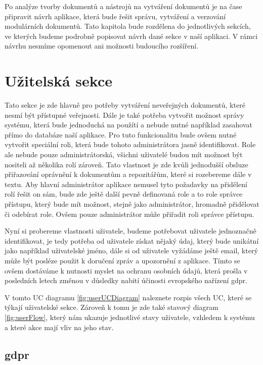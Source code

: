 Po analýze tvorby dokumentů a nástrojů na vytváření dokumentů je na čase připravit návrh aplikace, která bude řešit správu, vytváření a verzování
modulárních dokumentů. Tato kapitola bude rozdělena do jednotlivých sekcích, ve kterých budeme podrobně popisovat návrh dané sekce v naší aplikaci.
V rámci návrhu nesmíme opomenout ani možnosti budoucího rozšíření.

\section{Užitelská sekce}

Tato sekce je zde hlavně pro potřeby vytváření neveřejných dokumentů, které nesmí být přístupné veřejnosti. Dále je také potřeba vytvořit možnost
správy systému, která bude jednoduchá na použítí a nebude nutné například zasahovat přímo do databáze naší aplikace. Pro tuto funkcionalitu bude ovšem
nutné vytvořit speciální roli, která bude tohoto administrátora jasně identifikovat. Role ale nebude pouze administrátorská, všichni uživatelé budou mít
možnost být nositeli až několika rolí zároveň. Tato vlastnost je zde kvůli jednodušší obsluze přiřazování oprávnění k dokumentům a repozitářům, které si rozebereme
dále v textu. Aby hlavní administrátor aplikace nemusel tyto požadavky na přidělení rolí řešit on sám, bude zde ještě další pevně definovaná role a to role
správce přístupu, který bude mít možnost, stejně jako administrátor, hromadně přidělovat či odebírat role. Ovšem pouze administrátor může přiřadit roli správce přístupu.

Nyní si probereme vlastnosti uživatele, budeme potřebovat uživatele jednoznačně identifikovat, je tedy potřeba od uživatele získat nějaký údaj, který bude unikátní
jako například uživatelské jméno, dále si od uživatele vyžádáme ještě email, který může být posléze použit k doručení zpráv a upozornění z aplikace. Tímto se ovšem
dostáváme k nutnosti myslet na ochranu osobních údajů, která prošla v posledních letech změnou v důsledky nabití účinosti evropského nařízení \gls{gdpr}.

V tomto UC diagramu \ref{fig:userUCDiagram} naleznete rozpis všech UC, které se týkají uživatelské sekce. Zároveň k tomu je zde také stavový diagram \ref{fig:userFlow},
který nám ukazuje jednotlivé stavy uživatele, vzhledem k systému a které akce mají vliv na jeho stav.

\subsection{\gls{gdpr}}


